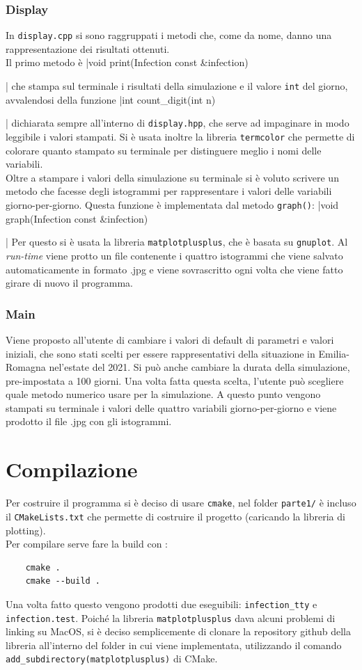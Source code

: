 \documentclass{article}
\begin{document}
{\subsubsection{Display}
In \verb|display.cpp| si sono raggruppati i metodi che, come da 
nome, danno una rappresentazione dei risultati ottenuti.\\
Il primo metodo è 
|void print(Infection const &infection){|
che stampa sul terminale i risultati della simulazione e il valore 
\verb|int| del giorno, avvalendosi della funzione 
|int count_digit(int n){|
dichiarata sempre all'interno di \verb|display.hpp|, che serve ad 
impaginare in modo leggibile i valori stampati.
Si è usata inoltre la libreria \verb|termcolor| che permette di 
colorare quanto stampato su terminale per distinguere meglio
i nomi delle variabili. \\
Oltre a stampare i valori della simulazione su terminale si è voluto
scrivere un metodo che facesse degli istogrammi per rappresentare i
valori delle variabili giorno-per-giorno.
Questa funzione è implementata dal metodo \verb|graph()|:
|void graph(Infection const &infection) {|
Per questo si è usata la libreria \verb|matplotplusplus|, che è 
basata su \verb|gnuplot|. Al \textit{run-time} viene protto un 
file contenente i quattro istogrammi che viene salvato 
automaticamente in formato .jpg e viene sovrascritto ogni volta che
viene fatto girare di nuovo il programma.
\subsubsection{Main}
Viene proposto all'utente di cambiare i valori di default di 
parametri e valori iniziali, che sono stati scelti per essere 
rappresentativi della situazione in Emilia-Romagna nel'estate del 
2021. Si può anche cambiare la durata della simulazione, 
pre-impostata a 100 giorni.
Una volta fatta questa scelta, l'utente può scegliere quale metodo 
numerico usare per la simulazione. A questo punto vengono stampati 
su terminale i valori delle quattro variabili giorno-per-giorno e 
viene prodotto il file .jpg con gli istogrammi.
\section{Compilazione}
\hspace{\parindent} Per costruire il programma si è deciso di usare 
\verb|cmake|, nel folder \verb|parte1/| è incluso il 
\verb|CMakeLists.txt| che permette di costruire il progetto 
(caricando la libreria di plotting).\\
Per compilare serve fare la build con :
\begin{verbatim}
    cmake .  
    cmake --build .
\end{verbatim} 
Una volta fatto questo vengono prodotti due
eseguibili: \verb|infection_tty| e \verb|infection.test|.
Poiché la libreria \verb|matplotplusplus| dava alcuni problemi di
linking su MacOS, si è deciso semplicemente di clonare la repository
github della libreria all'interno del folder in cui viene implementata, 
utilizzando il comando \verb|add_subdirectory(matplotplusplus)|
di CMake.
}}}}
\end{document}
